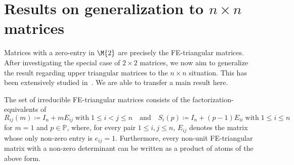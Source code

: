 \section{Results on generalization to $n\times n$ matrices}

Matrices with a zero-entry in $\M{2}$ are precisely the FE-triangular matrices. After investigating the special case of $2 \times 2$ matrices, we now aim to generalize the result regarding upper triangular matrices to the $n \times n$ situation. This has been extensively studied in~\cite{Baeth2020}. We are able to transfer a main result here.

\begin{theorem}\label{theorem:nxn-upper-triangular}
The set of irreducible FE-triangular matrices consists of the factorization-equivalents of
\[ R_{ij}(m) \coloneqq I_n + mE_{ij}\;\text{with}\;1\leq i < j\leq n\quad\text{and}\quad S_i(p) \coloneqq I_n + (p-1)E_{ii}\;\text{with}\;1\leq i \leq n \]
for $m=1$ and $p \in \mathbb{P}$, where, for every pair $1 \leq i,j \leq n$, $E_{ij}$ denotes the matrix whose only non-zero entry is $e_{ij} = 1$.  Furthermore, every non-unit FE-triangular matrix with a non-zero determinant can be written as a product of atoms of the above form.
\end{theorem}

